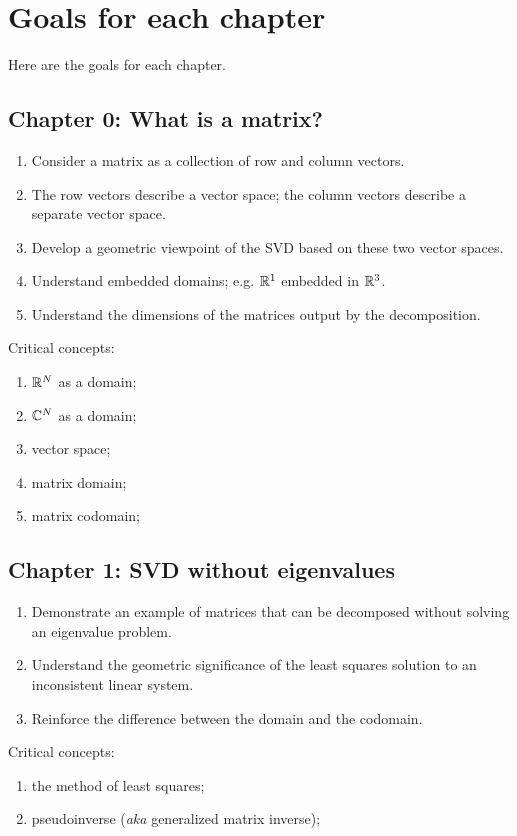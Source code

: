 \chapter*{Goals for each chapter}

Here are the goals for each chapter.

\section*{Chapter 0: What is a matrix?}
\begin{enumerate}
\item Consider a matrix as a collection of row and column vectors.
\item The row vectors describe a vector space; the column vectors describe a separate vector space.
\item Develop a geometric viewpoint of the SVD based on these two vector spaces.
\item Understand embedded domains; e.g. $\mathbb{R}^{1}$ embedded in $\mathbb{R}^{3}$.
\item Understand the dimensions of the matrices output by the decomposition.
\end{enumerate}

Critical concepts:
\begin{enumerate}
\item $\mathbb{R}^{N}$ as a domain;
\item $\mathbb{C}^{N}$ as a domain;
\item vector space;
\item matrix domain;
\item matrix codomain;
\end{enumerate}

\section*{Chapter 1: SVD without eigenvalues}
\begin{enumerate}
\item Demonstrate an example of matrices that can be decomposed without solving an eigenvalue problem.
\item Understand the geometric significance of the least squares solution to an inconsistent linear system.
\item Reinforce the difference between the domain and the codomain.
\end{enumerate}

Critical concepts:
\begin{enumerate}
\item the method of least squares;
\item pseudoinverse (\textit{aka} generalized matrix inverse);
\end{enumerate}

